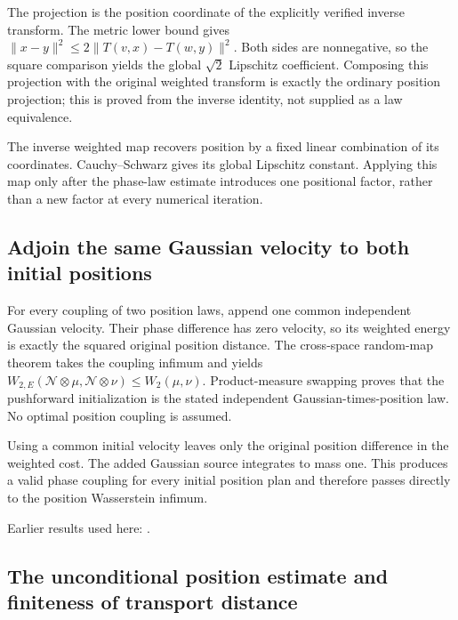 \documentclass[11pt,a4paper]{report}
\begin{document}
The projection is the position coordinate of the explicitly verified inverse transform. The metric lower bound gives \(\|x-y\|^2\le2\|T(v,x)-T(w,y)\|^2\). Both sides are nonnegative, so the square comparison yields the global \(\sqrt 2\) Lipschitz coefficient. Composing this projection with the original weighted transform is exactly the ordinary position projection; this is proved from the inverse identity, not supplied as a law equivalence.



The inverse weighted map recovers position by a fixed linear combination of its coordinates. Cauchy–Schwarz gives its global Lipschitz constant. Applying this map only after the phase-law estimate introduces one positional factor, rather than a new factor at every numerical iteration.

\subsection{\texorpdfstring{Adjoin the same Gaussian velocity to both initial positions}{Adjoin the same Gaussian velocity to both initial positions}}
\label{report-step-KineticLangevin-OBABOPosition-lean-2}


For every coupling of two position laws, append one common independent Gaussian velocity. Their phase difference has zero velocity, so its weighted energy is exactly the squared original position distance. The cross-space random-map theorem takes the coupling infimum and yields \(W_{2,E}(\mathcal N\otimes\mu,\mathcal N\otimes\nu)\le W_2(\mu,\nu)\). Product-measure swapping proves that the pushforward initialization is the stated independent Gaussian-times-position law. No optimal position coupling is assumed.



Using a common initial velocity leaves only the original position difference in the weighted cost. The added Gaussian source integrates to mass one. This produces a valid phase coupling for every initial position plan and therefore passes directly to the position Wasserstein infimum.



Earlier results used here: \cite[Section~3.17.3]{LangevinLean2026ULASC}.
\subsection{\texorpdfstring{The unconditional position estimate and finiteness of transport distance}{The unconditional position estimate and finiteness of transport distance}}
\label{report-step-KineticLangevin-OBABOPosition-lean-3}
\end{document}
